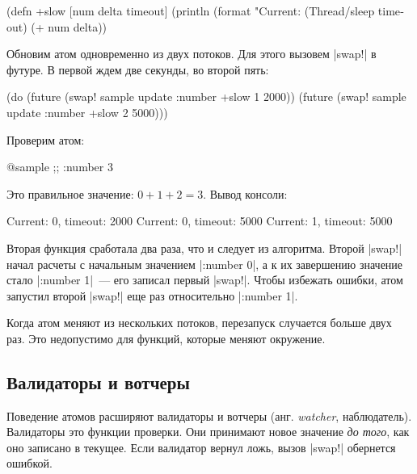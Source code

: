 \begin{english}
  \begin{clojure}
(defn +slow
  [num delta timeout]
  (println (format "Current: %
  (Thread/sleep timeout)
  (+ num delta))
  \end{clojure}
\end{english}

Обновим атом одновременно из двух потоков. Для этого вызовем \spverb|swap!| в
футуре. В первой ждем две секунды, во второй пять:

\begin{english}
  \begin{clojure}
(do (future (swap! sample update :number +slow 1 2000))
    (future (swap! sample update :number +slow 2 5000)))
  \end{clojure}
\end{english}

\noindent
Проверим атом:

\begin{english}
  \begin{clojure}
@sample ;; {:number 3}
  \end{clojure}
\end{english}

\noindent
Это правильное значение: $0 + 1 + 2 = 3$. Вывод консоли:

\begin{english}
  \begin{text}
Current: 0, timeout: 2000
Current: 0, timeout: 5000
Current: 1, timeout: 5000
  \end{text}
\end{english}

Вторая функция сработала два раза, что и следует из алгоритма. Второй
\spverb|swap!| начал расчеты с начальным значением \spverb|{:number 0}|, а к их
завершению значение стало \spverb|{:number 1}|~--- его записал первый
\spverb|swap!|. Чтобы избежать ошибки, атом запустил второй \spverb|swap!| еще
раз относительно \spverb|{:number 1}|.

Когда атом меняют из нескольких потоков, перезапуск случается больше двух
раз. Это недопустимо для функций, которые меняют окружение.

\subsection{Валидаторы и вотчеры}

Поведение атомов расширяют валидаторы и вотчеры (анг. \emph{watcher},
наблюдатель). Валидаторы это функции проверки. Они принимают новое значение
\emph{до того}, как оно записано в текущее. Если валидатор вернул ложь, вызов
\spverb|swap!| обернется ошибкой.

